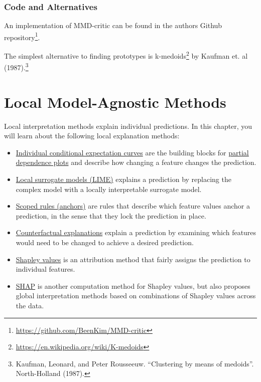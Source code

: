 \documentclass[
  12pt,
]{krantz}
\providecommand{\tightlist}{%
  \setlength{\itemsep}{0pt}\setlength{\parskip}{0pt}}
\renewcommand{\href}[2]{#2\footnote{\url{#1}}}
\begin{document}
\hypertarget{code-and-alternatives}{%
\subsection{Code and Alternatives}\label{code-and-alternatives}}

An implementation of MMD-critic can be found in \href{https://github.com/BeenKim/MMD-critic}{the authors Github repository}.

The simplest alternative to finding prototypes is \href{https://en.wikipedia.org/wiki/K-medoids}{k-medoids} by Kaufman et. al (1987).\footnote{Kaufman, Leonard, and Peter Rousseeuw. ``Clustering by means of medoids''. North-Holland (1987).}

\hypertarget{local-methods}{%
\chapter{Local Model-Agnostic Methods}\label{local-methods}}

Local interpretation methods explain individual predictions.
In this chapter, you will learn about the following local explanation methods:

\begin{itemize}
\tightlist
\item
  \protect\hyperlink{ice}{Individual conditional expectation curves} are the building blocks for \protect\hyperlink{pdp}{partial dependence plots} and describe how changing a feature changes the prediction.
\item
  \protect\hyperlink{lime}{Local surrogate models (LIME)} explains a prediction by replacing the complex model with a locally interpretable surrogate model.
\item
  \protect\hyperlink{anchors}{Scoped rules (anchors)} are rules that describe which feature values anchor a prediction, in the sense that they lock the prediction in place.
\item
  \protect\hyperlink{counterfactual}{Counterfactual explanations} explain a prediction by examining which features would need to be changed to achieve a desired prediction.
\item
  \protect\hyperlink{shapley}{Shapley values} is an attribution method that fairly assigns the prediction to individual features.
\item
  \protect\hyperlink{shap}{SHAP} is another computation method for Shapley values, but also proposes global interpretation methods based on combinations of Shapley values across the data.
\end{itemize}
\end{document}
